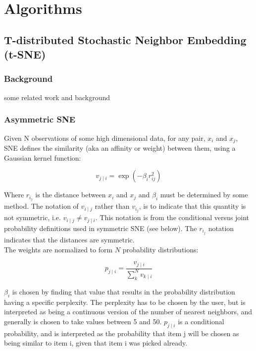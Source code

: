 \part{Algorithms} \label{part:three algorithms}

\chapter{T-distributed Stochastic Neighbor Embedding (t-SNE)}

\section{Background}

some related work and background

\section{Asymmetric SNE}

Given N observations of some high dimensional data, for any pair, $x_i$ and $x_j$, SNE defines the similarity (aka an affinity or weight) between them, using a Gaussian kernel function:

\begin{equation*}
    {v_{j\mid i}} = \exp {(-\beta_i r^2_{ij})} 
\end{equation*}

\noindent Where $r_i_j$ is the distance between $x_i$ and $x_j$ and $\beta_i$ must be determined by some method. The notation of $v_{i \mid j}$ rather than $v_i_j$, is to indicate that this quantity is not symmetric, i.e. $v_{i \mid j} \neq v_{j \mid i}$. This notation is from the conditional versus joint probability definitions used in symmetric SNE (see below). The $r_i_j$ notation indicates that the distances are symmetric.\\

\noindent The weights are normalized to form $N$ probability distributions:

\begin{equation*}
    {p_{j\mid i}} = \frac {v_{j\mid i}} {\sum_k^N v_{k\mid i}}
\end{equation*}

\noindent $\beta_i$ is chosen by finding that value that results in the probability distribution having a specific perplexity. The perplexity has to be chosen by the user, but is interpreted as being a continuous version of the number of nearest neighbors, and generally is chosen to take values between 5 and 50. $p_{j\mid i}$ is a conditional probability, and is interpreted as the probability that item j will be chosen as being similar to item i, given that item i was picked already.

